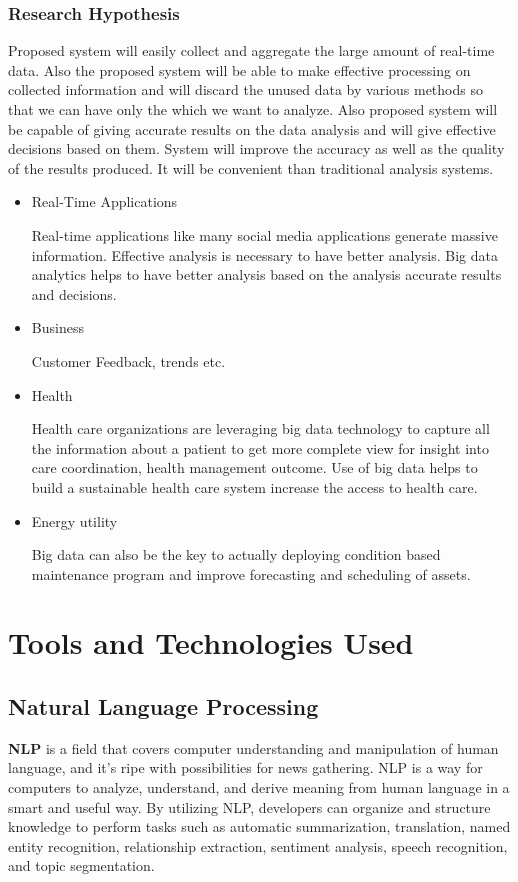 \documentclass[oneside,a4paper,12pt]{book}
\begin{document}
\subsubsection{ Research Hypothesis}
\par Proposed system will easily collect and aggregate the large amount of real-time data. Also the proposed system will be able to make effective processing on collected information and will discard the unused data by various methods so that we can have only the which we want to analyze. Also proposed system will be capable of giving accurate results on the data analysis and will give effective decisions based on them. System will improve the accuracy as well as the quality of the results produced. It will be convenient than traditional analysis systems.
\begin{itemize}
    \item Real-Time Applications
    \par Real-time applications like many social media applications generate massive information. Effective analysis is necessary to have better analysis. Big data analytics helps to have better analysis based on the analysis accurate results and decisions.
    \item Business
    \par Customer Feedback, trends etc.
    \item Health
    \par Health care organizations are leveraging big data technology to capture all the information about a patient to get more complete view for insight into care coordination, health management outcome. Use of big data helps to build a sustainable health care system increase the access to health care.
    \item  Energy utility
    \par Big data can also be the key to actually deploying condition based maintenance program and improve forecasting and scheduling of assets.
\end{itemize}
\section{Tools and Technologies Used}
\subsection{Natural Language Processing}
\textbf{NLP} is a field that covers computer understanding and manipulation of human language, and it’s ripe with possibilities for news gathering. NLP is a way for computers to analyze, understand, and derive meaning from human language in a smart and useful way. By utilizing NLP, developers can organize and structure knowledge to perform tasks such as automatic summarization, translation, named entity recognition, relationship extraction, sentiment analysis, speech recognition, and topic segmentation.
\end{document}
